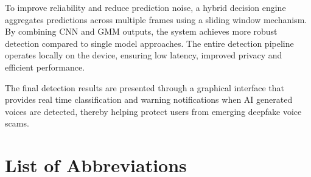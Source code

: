 \documentclass[12pt,a4paper,titlepage]{report}
\begin{document}
To improve reliability and reduce prediction noise, a hybrid decision engine aggregates predictions across multiple frames using a sliding window mechanism. By combining CNN and GMM outputs, the system achieves more robust detection compared to single model approaches. The entire detection pipeline operates locally on the device, ensuring low latency, improved privacy and efficient performance.

The final detection results are presented through a graphical interface that provides real time classification and warning notifications when AI generated voices are detected, thereby helping protect users from emerging deepfake voice scams.


		
	
	
	\newpage
	\normalsize{}
	
	\tableofcontents
	\newpage
	

	\listoffigures
	\newpage
	

	\listoftables
    \newpage
    
    \chapter*{List of Abbreviations}
    
\end{document}
